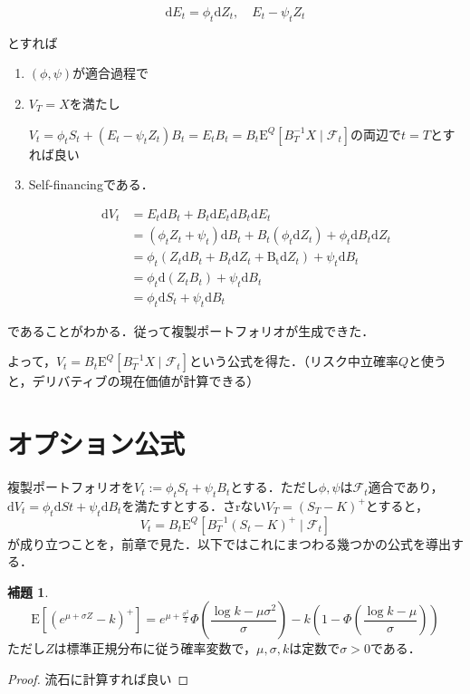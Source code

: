 \documentclass{jsarticle}
\theoremstyle{definition}
\newtheorem{lem}[dfn]{補題}
\begin{document}
\begin{equation*}
    \mathrm{d}E_t = \phi_t \mathrm{d}Z_t, \quad E_t - \psi_t Z_t
\end{equation*}

とすれば
\begin{enumerate}
    \item $(\phi, \psi)$が適合過程で
    \item $V_T = X$を満たし\par
            $V_t = \phi_t S_t + (E_t - \psi_t Z_t) B_t = E_t B_t = B_t \mathrm{E}^Q\left[B_T^{-1} X \mid \mathscr{F}_t\right]$の両辺で$t=T$とすれば良い
    \item Self-financingである．\par
            \begin{align*}
                \mathrm{d}V_t &= E_t \mathrm{d}B_t + B_t\mathrm{d}E_t \mathrm{d}B_t\mathrm{d}E_t\\
                &= (\phi_t Z_t + \psi_t)\mathrm{d}B_t + B_t (\phi_t \mathrm{d}Z_t) + \phi_t\mathrm{d} B_t\mathrm{d}Z_t\\
                &= \phi_t (Z_t\mathrm{d}B_t + B_t \mathrm{d}Z_t + \mathrm{B_t}\mathrm{d}Z_t) + \psi_t \mathrm{d}B_t\\
                &= \phi_t \mathrm{d}(Z_t B_t) + \psi_t \mathrm{d}B_t\\
                &= \phi_t \mathrm{d}S_t  + \psi_t \mathrm{d}B_t
            \end{align*}
\end{enumerate}
であることがわかる．従って複製ポートフォリオが生成できた．

よって，$V_t = B_t\mathrm{E}^Q \left[B_T^{-1}X \mid \mathscr{F}_t\right]$という公式を得た．（リスク中立確率$Q$と使うと，デリバティブの現在価値が計算できる）

\section{オプション公式}
複製ポートフォリオを$V_t := \phi_t S_t + \psi_t B_t$とする．ただし$\phi, \psi$は$\mathscr{F}_t$適合であり，$\mathrm{d}V_t = \phi_t \mathrm{d}St + \psi_t \mathrm{d}B_t$を満たすとする．さrない$V_T = (S_T - K)^+$とすると，
\begin{equation*}
    V_t = B_t \mathrm{E}^Q\left[B_T^{-1}(S_t - K)^+ \mid \mathscr{F}_t\right]
\end{equation*}
が成り立つことを，前章で見た．以下ではこれにまつわる幾つかの公式を導出する．

\begin{lem}
    $$
    \mathrm{E}\left[(e^{\mu + \sigma Z} - k)^+\right] = e^{\mu + \frac{\sigma^2}{2}} \Phi(\frac{\log{k} - \mu \sigma^2}{\sigma}) - k (1 - \Phi(\frac{\log{k} - \mu}{\sigma}))
    $$
    ただし$Z$は標準正規分布に従う確率変数で，$\mu, \sigma, k$は定数で$\sigma > 0$である．
\end{lem}
\begin{proof}
    流石に計算すれば良い
\end{proof}
\end{document}
